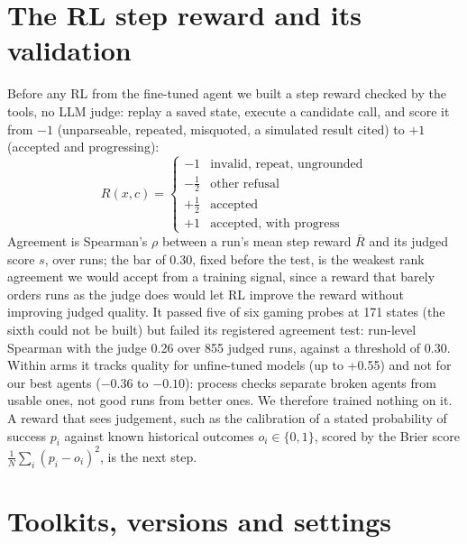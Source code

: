 \documentclass[11pt]{article}
\begin{document}
\section{The RL step reward and its validation}
\label{app:reward}

Before any RL from the fine-tuned agent we built a step reward checked
by the tools, no LLM judge: replay a saved state, execute a candidate call, and score it from $-1$ (unparseable,
repeated, misquoted, a simulated result cited) to $+1$ (accepted and progressing):
\begin{equation}
R(x, c) = \begin{cases} -1 & \text{invalid, repeat, ungrounded} \\ -\tfrac12 & \text{other refusal} \\ +\tfrac12 & \text{accepted} \\ +1 & \text{accepted, with progress} \end{cases}
\end{equation}
Agreement is Spearman's $\rho$ between a run's mean step reward $\bar R$ and its judged score $s$, over runs; the
bar of 0.30, fixed before the test, is the weakest rank agreement we would accept from a training signal, since a
reward that barely orders runs as the judge does would let RL improve the reward without improving judged quality. It passed five of six gaming probes
at 171 states (the sixth could not be built) but failed its registered agreement test: run-level Spearman with the
judge 0.26 over 855 judged runs, against a threshold of 0.30. Within arms it tracks quality for unfine-tuned models
(up to +0.55) and not for our best agents ($-0.36$ to $-0.10$): process checks separate broken agents from usable ones,
not good runs from better ones. We therefore trained nothing on it. A reward that sees judgement, such as the
calibration of a stated probability of success $p_i$ against known historical outcomes $o_i \in \{0, 1\}$, scored by
the Brier score $\tfrac{1}{N}\sum_i (p_i - o_i)^2$, is the next step.

\section{Toolkits, versions and settings}
\end{document}
